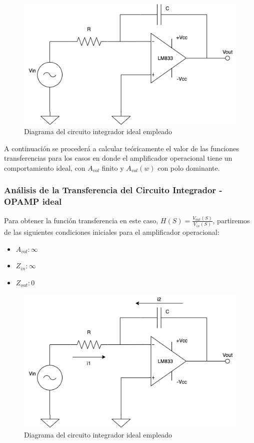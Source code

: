 \begin{figure}[H]
    \centering 
    \includegraphics [scale=0.5] {../Ejercicio3-CircuitoIntegradoresyDerivadores/Imagenes/diagrama-integrador.png} 
    \caption{Diagrama del circuito integrador ideal empleado}
    \label{fig:emptyPlotTool}
\end{figure}

A continuación se procederá a calcular teóricamente el valor de las funciones transferencias para los casos en 
donde el amplificador operacional tiene un comportamiento ideal, con $A_{vol}$ finito y $A_{vol}(w)$ con polo dominante.

\subsubsection{Análisis de la Transferencia del Circuito Integrador - OPAMP ideal}

Para obtener la función transferencia en este caso, $H(S) = \frac{V_{out} (S)}{V_{in} (S)}$, partiremos de las siguientes condiciones
iniciales para el amplificador operacional:

\begin{itemize}
	\item $A_{vol}: \infty$
	\item $Z_{in}: \infty$
	\item $Z_{out}: 0$
\end{itemize}

\begin{figure}[H]
    \centering 
    \includegraphics [scale=0.5] {../Ejercicio3-CircuitoIntegradoresyDerivadores/Imagenes/diagrama-integrador-corrientes.png} 
    \caption{Diagrama del circuito integrador ideal empleado}
    \label{fig:emptyPlotTool}
\end{figure}

